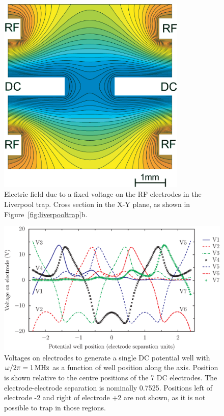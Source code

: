\begin{figure}[!t]
\centering
\includegraphics[width=9cm]{chapter2/liverpool_contours_v1_4}
\caption[Calculation of electric field in the Liverpool trap]{Electric field due to a fixed voltage on the RF electrodes in the Liverpool trap. Cross section in the X-Y plane, as shown in Figure~\ref{fig:liverpooltrap}b.}
\label{fig:liverpoolfields}
\end{figure} 


\begin{figure}[!t]
\centering
\includegraphics[width=14cm]{chapter2/liverpool/vcalc_allelectrodes}
\caption[Voltages on DC electrodes of Liverpool trap]{Voltages on electrodes to generate a single DC potential well with $\omega/2\pi = 1\,\mbox{MHz}$ as a function of well position along the axis. Position is shown relative to the centre positions of the 7 DC electrodes. The electrode-electrode separation is nominally 0.7525\mm. Positions left of electrode -2 and right of electrode +2 are not shown, as it is not possible to trap in those regions. \cversion}
\label{fig:liverpoolvolts}
\end{figure} 


